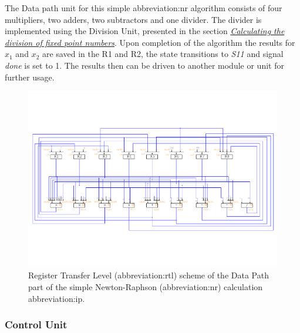 \documentclass[a4paper, twoside, 11pt]{article}
\newcommand{\fbar}{\FloatBarrier}
\begin{document}
            The Data path unit for this simple \gls{abbreviation:nr} algorithm consists of four multipliers, two adders, two subtractors and one divider. The divider is implemented using the Division Unit, presented in the section \hyperref[sec:calculating-the-division-of-fixed-point-numbers]{\textit{Calculating the division of fixed point numbers}}. Upon completion of the algorithm the results for $x_1$ and $x_2$ are saved in the R1 and R2, the state transitions to \textit{S11} and signal \textit{done} is set to 1. The results then can be driven to another module or unit for further usage.
            \begin{figure}[htbp!]
                \centering
                \includegraphics[width=1\textwidth]{src/pdf/simple-nr-rtl.pdf}
                \caption{Register Transfer Level (\gls{abbreviation:rtl}) scheme of the Data Path part of the simple Newton-Raphson (\gls{abbreviation:nr}) calculation \gls{abbreviation:ip}.}
                \label{fig:simple-nr-rtl}
                \end{figure}

        \fbar
        \subsubsection{Control Unit}\label{subsubsec:simple-nr-control-unit}
\end{document}
